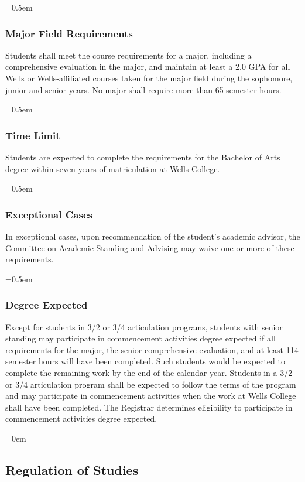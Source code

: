 \documentclass{manual}
\let\oldsubsection\subsection
\renewcommand\subsection{\leftskip=0em\oldsubsection}
\let\oldsubsubsection\subsubsection
\renewcommand\subsubsection{\leftskip=0.5em\oldsubsubsection}
\begin{document}
\subsubsection{Major Field Requirements}

Students  shall meet the course requirements for a major, including a comprehensive evaluation in the major, and maintain at least a 2.0 GPA for all Wells or Wells-affiliated courses taken for the major field during the sophomore, junior and senior years. No major shall require more than 65 semester hours.

\subsubsection{Time Limit}

Students are expected to complete the requirements for the Bachelor of Arts degree within seven years of matriculation at Wells College. 

\subsubsection{Exceptional Cases}

In exceptional cases, upon recommendation of the student's academic advisor, the Committee on Academic Standing and Advising may waive one or more of these requirements.

\subsubsection{Degree Expected}

Except  for students in 3/2 or 3/4 articulation programs, students with senior standing may participate in commencement activities degree expected if all requirements for the major, the senior comprehensive evaluation, and at least 114 semester hours will have been completed. Such students would be expected to complete the remaining work by the end of the calendar year. Students in a 3/2 or 3/4 articulation program shall be expected to follow the terms of the program and may participate in commencement activities when the work at Wells College shall have been completed. The Registrar determines eligibility to participate in commencement activities degree expected.

\subsection{Regulation of Studies}\label{sec:RegulationOfStudies}
\end{document}
